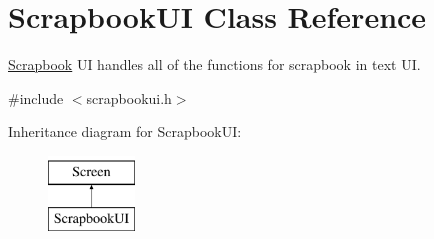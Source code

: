 \hypertarget{classScrapbookUI}{}\section{Scrapbook\+UI Class Reference}
\label{classScrapbookUI}


\hyperlink{classScrapbook}{Scrapbook} UI handles all of the functions for scrapbook in text UI.  




{\ttfamily \#include $<$scrapbookui.\+h$>$}

Inheritance diagram for Scrapbook\+UI\+:\begin{figure}[H]
\begin{center}
\leavevmode
\includegraphics[height=2.000000cm]{classScrapbookUI}
\end{center}
\end{figure}

